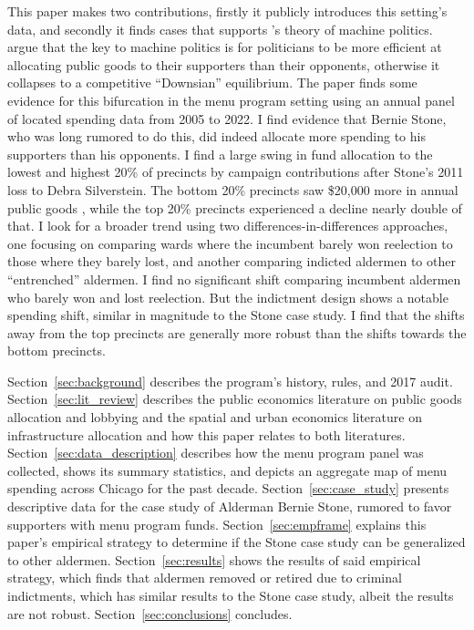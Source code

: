 This paper makes two contributions, firstly it publicly introduces this setting's data, and secondly it finds cases that supports \cite{dixit_londregan1996}'s theory of machine politics.
\cite{dixit_londregan1996} argue that the key to machine politics is for politicians to be more efficient at allocating public goods to their supporters than their opponents, otherwise it collapses to a competitive ``Downsian'' equilibrium.
The paper finds some evidence for this bifurcation in the menu program setting using an annual panel of located spending data from 2005 to 2022.
I find evidence that Bernie Stone, who was long rumored to do this, did indeed allocate more spending to his supporters than his opponents.
I find a large swing in fund allocation to the lowest and highest 20\% of precincts by campaign contributions after Stone's 2011 loss to Debra Silverstein. 
The bottom 20\% precincts saw \$20,000 more in annual public goods , while the top 20\% precincts experienced a decline nearly double of that.
I look for a broader trend using two differences-in-differences approaches, one focusing on comparing wards where the incumbent barely won reelection to those where they barely lost, and another comparing indicted aldermen to other ``entrenched'' aldermen.
I find no significant shift comparing incumbent aldermen who barely won and lost reelection.
But the indictment design shows a notable spending shift, similar in magnitude to the Stone case study.
I find that the shifts away from the top precincts are generally more robust than the shifts towards the bottom precincts.



Section~\ref{sec:background} describes the program's history, rules, and 2017 audit.
Section~\ref{sec:lit_review} describes the public economics literature on public goods allocation and lobbying and the spatial and urban economics literature on infrastructure allocation and how this paper relates to both literatures.
Section~\ref{sec:data_description} describes how the menu program panel was collected, shows its summary statistics, and depicts an aggregate map of menu spending across Chicago for the past decade.
Section~\ref{sec:case_study} presents descriptive data for the case study of Alderman Bernie Stone, rumored to favor supporters with menu program funds. 
Section~\ref{sec:empframe} explains this paper's empirical strategy to determine if the Stone case study can be generalized to other aldermen.
Section~\ref{sec:results} shows the results of said empirical strategy, which finds that aldermen removed or retired due to criminal indictments, which has similar results to the Stone case study, albeit the results are not robust. 
Section~\ref{sec:conclusions} concludes.

